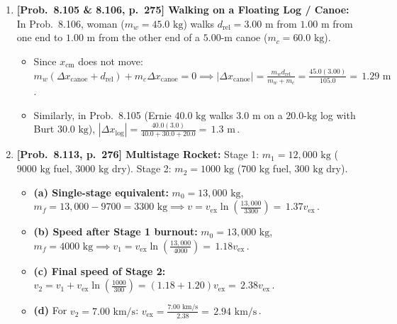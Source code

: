 \documentclass[11pt,a4paper,openany,oneside]{book}
\newcommand{\eqbox}[1]{\boxed{\,#1\,}}
\numberwithin{equation}{chapter}
\begin{document}
\begin{enumerate}[label=\textbf{Prob.\ \arabic*},leftmargin=4.2em]
  \item \textbf{[Prob.\ 8.105 \& 8.106, p.\ 275] Walking on a Floating Log / Canoe:}
  In Prob.\ 8.106, woman ($m_w = 45.0\text{ kg}$) walks $d_{\text{rel}} = 3.00\text{ m}$ from $1.00\text{ m}$ from one end to $1.00\text{ m}$ from the other end of a $5.00\text{-m}$ canoe ($m_c = 60.0\text{ kg}$).
  \begin{itemize}
    \item Since $x_{\text{cm}}$ does not move: $m_w(\Delta x_{\text{canoe}} + d_{\text{rel}}) + m_c\Delta x_{\text{canoe}} = 0 \implies |\Delta x_{\text{canoe}}| = \frac{m_w d_{\text{rel}}}{m_w + m_c} = \frac{45.0(3.00)}{105.0} = \eqbox{1.29\text{ m}}$.
    \item Similarly, in Prob.\ 8.105 (Ernie $40.0\text{ kg}$ walks $3.0\text{ m}$ on a $20.0\text{-kg}$ log with Burt $30.0\text{ kg}$), $|\Delta x_{\text{log}}| = \frac{40.0(3.0)}{40.0+30.0+20.0} = \eqbox{1.3\text{ m}}$.
  \end{itemize}

  \item \textbf{[Prob.\ 8.113, p.\ 276] Multistage Rocket:}
  Stage 1: $m_1 = 12,000\text{ kg}$ ($9000\text{ kg}$ fuel, $3000\text{ kg}$ dry). Stage 2: $m_2 = 1000\text{ kg}$ ($700\text{ kg}$ fuel, $300\text{ kg}$ dry).
  \begin{itemize}
    \item \textbf{(a) Single-stage equivalent:} $m_0 = 13,000\text{ kg}$, $m_f = 13,000 - 9700 = 3300\text{ kg} \implies v = v_{\text{ex}}\ln\!\left(\frac{13,000}{3300}\right) = \eqbox{1.37v_{\text{ex}}}$.
    \item \textbf{(b) Speed after Stage 1 burnout:} $m_0 = 13,000\text{ kg}$, $m_f = 4000\text{ kg} \implies v_1 = v_{\text{ex}}\ln\!\left(\frac{13,000}{4000}\right) = \eqbox{1.18v_{\text{ex}}}$.
    \item \textbf{(c) Final speed of Stage 2:} $v_2 = v_1 + v_{\text{ex}}\ln\!\left(\frac{1000}{300}\right) = (1.18 + 1.20)v_{\text{ex}} = \eqbox{2.38v_{\text{ex}}}$.
    \item \textbf{(d)} For $v_2 = 7.00\text{ km/s}$: $v_{\text{ex}} = \frac{7.00\text{ km/s}}{2.38} = \eqbox{2.94\text{ km/s}}$.
  \end{itemize}


\end{enumerate}
\end{document}
